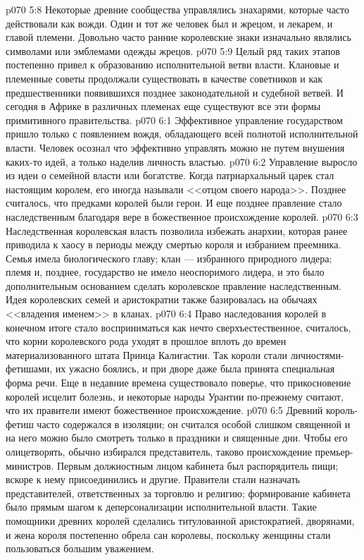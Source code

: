 \vs p070 5:8 Некоторые древние сообщества управлялись знахарями, которые часто действовали как вожди. Один и тот же человек был и жрецом, и лекарем, и главой племени. Довольно часто ранние королевские знаки изначально являлись символами или эмблемами одежды жрецов.
\vs p070 5:9 Целый ряд таких этапов постепенно привел к образованию исполнительной ветви власти. Клановые и племенные советы продолжали существовать в качестве советников и как предшественники появившихся позднее законодательной и судебной ветвей. И сегодня в Африке в различных племенах еще существуют все эти формы примитивного правительства.
\vs p070 6:1 Эффективное управление государством пришло только с появлением вождя, обладающего всей полнотой исполнительной власти. Человек осознал что эффективно управлять можно не путем внушения каких\hyp{}то идей, а только наделив личность властью.
\vs p070 6:2 Управление выросло из идеи о семейной власти или богатстве. Когда патриархальный царек стал настоящим королем, его иногда называли <<отцом своего народа>>. Позднее считалось, что предками королей были герои. И еще позднее правление стало наследственным благодаря вере в божественное происхождение королей.
\vs p070 6:3 Наследственная королевская власть позволила избежать анархии, которая ранее приводила к хаосу в периоды между смертью короля и избранием преемника. Семья имела биологического главу; клан --- избранного природного лидера; племя и, позднее, государство не имело неоспоримого лидера, и это было дополнительным основанием сделать королевское правление наследственным. Идея королевских семей и аристократии также базировалась на обычаях <<владения именем>> в кланах.
\vs p070 6:4 Право наследования королей в конечном итоге стало восприниматься как нечто сверхъестественное, считалось, что корни королевского рода уходят в прошлое вплоть до времен материализованного штата Принца Калигастии. Так короли стали личностями\hyp{}фетишами, их ужасно боялись, и при дворе даже была принята специальная форма речи. Еще в недавние времена существовало поверье, что прикосновение королей исцелит болезнь, и некоторые народы Урантии по\hyp{}прежнему считают, что их правители имеют божественное происхождение.
\vs p070 6:5 Древний король\hyp{}фетиш часто содержался в изоляции; он считался особой слишком священной и на него можно было смотреть только в праздники и священные дни. Чтобы его олицетворять, обычно избирался представитель, таково происхождение премьер\hyp{}министров. Первым должностным лицом кабинета был распорядитель пищи; вскоре к нему присоединились и другие. Правители стали назначать представителей, ответственных за торговлю и религию; формирование кабинета было прямым шагом к деперсонализации исполнительной власти. Такие помощники древних королей сделались титулованной аристократией, дворянами, и жена короля постепенно обрела сан королевы, поскольку женщины стали пользоваться большим уважением.
